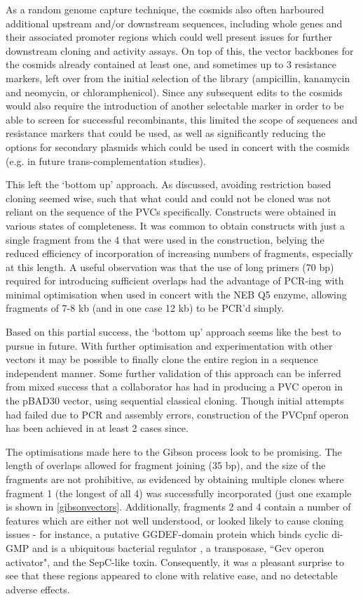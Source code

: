 As a random genome capture technique, the cosmids also often harboured additional upstream and/or downstream sequences, including whole genes and their associated promoter regions which could well present issues for further downstream cloning and activity assays. On top of this, the vector backbones for the cosmids already contained at least one, and sometimes up to 3 resistance markers, left over from the initial selection of the library (ampicillin, kanamycin and neomycin, or chloramphenicol). Since any subsequent edits to the cosmids would also require the introduction of another selectable marker in order to be able to screen for successful recombinants, this limited the scope of sequences and resistance markers that could be used, as well as significantly reducing the options for secondary plasmids which could be used in concert with the cosmids (e.g. in future trans-complementation studies).

This left the `bottom up' approach. As discussed, avoiding restriction based cloning seemed wise, such that what could and could not be cloned was not reliant on the sequence of the PVCs specifically. Constructs were obtained in various states of completeness. It was common to obtain constructs with just a single fragment from the 4 that were used in the construction, belying the reduced efficiency of incorporation of increasing numbers of fragments, especially at this length. A useful observation was that the use of long primers (70 bp) required for introducing sufficient overlaps had the advantage of PCR-ing with minimal optimisation when used in concert with the NEB Q5 enzyme, allowing fragments of 7-8 kb (and in one case 12 kb) to be PCR'd simply.

Based on this partial success, the `bottom up' approach seems like the best to pursue in future. With further optimisation and experimentation with other vectors it may be possible to finally clone the entire region in a sequence independent manner. Some further validation of this approach can be inferred from mixed success that a collaborator has had in producing a PVC operon in the pBAD30 vector, using sequential classical cloning. Though initial attempts had failed due to PCR and assembly errors, construction of the PVCpnf operon has been achieved in at least 2 cases since.

The optimisations made here to the Gibson process look to be promising. The length of overlaps allowed for fragment joining (35 bp), and the size of the fragments are not prohibitive, as evidenced by obtaining multiple clones where fragment 1 (the longest of all 4) was successfully incorporated (just one example is shown in \vref{gibsonvectors}. Additionally, fragments 2 and 4 contain a number of features which are either not well understood, or looked likely to cause cloning issues - for instance, a putative GGDEF-domain protein which binds cyclic di-GMP and is a ubiquitous bacterial regulator \citep{Paul2004}, a transposase, ``Gcv operon activator", and the SepC-like toxin. Consequently, it was a pleasant surprise to see that these regions appeared to clone with relative ease, and no detectable adverse effects.

